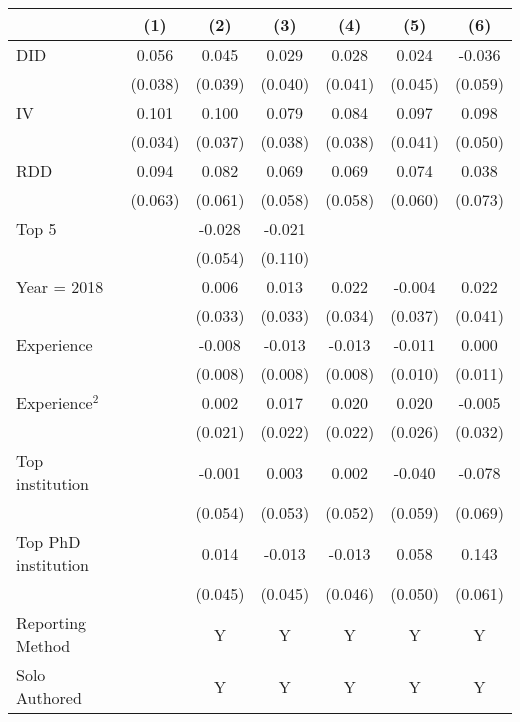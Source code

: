 \begin{tabular}{l*{6}{c}}
\hline\hline
                &\multicolumn{1}{c}{(1)}&\multicolumn{1}{c}{(2)}&\multicolumn{1}{c}{(3)}&\multicolumn{1}{c}{(4)}&\multicolumn{1}{c}{(5)}&\multicolumn{1}{c}{(6)}\\
\hline
DID             &    0.056&    0.045&    0.029&    0.028&    0.024&   -0.036\\
                &  (0.038)&  (0.039)&  (0.040)&  (0.041)&  (0.045)&  (0.059)\\
IV              &    0.101&    0.100&    0.079&    0.084&    0.097&    0.098\\
                &  (0.034)&  (0.037)&  (0.038)&  (0.038)&  (0.041)&  (0.050)\\
RDD             &    0.094&    0.082&    0.069&    0.069&    0.074&    0.038\\
                &  (0.063)&  (0.061)&  (0.058)&  (0.058)&  (0.060)&  (0.073)\\
Top 5           &         &   -0.028&   -0.021&         &         &         \\
                &         &  (0.054)&  (0.110)&         &         &         \\
Year = 2018     &         &    0.006&    0.013&    0.022&   -0.004&    0.022\\
                &         &  (0.033)&  (0.033)&  (0.034)&  (0.037)&  (0.041)\\
Experience      &         &   -0.008&   -0.013&   -0.013&   -0.011&    0.000\\
                &         &  (0.008)&  (0.008)&  (0.008)&  (0.010)&  (0.011)\\
Experience$^2$  &         &    0.002&    0.017&    0.020&    0.020&   -0.005\\
                &         &  (0.021)&  (0.022)&  (0.022)&  (0.026)&  (0.032)\\
Top institution &         &   -0.001&    0.003&    0.002&   -0.040&   -0.078\\
                &         &  (0.054)&  (0.053)&  (0.052)&  (0.059)&  (0.069)\\
Top PhD institution&         &    0.014&   -0.013&   -0.013&    0.058&    0.143\\
                &         &  (0.045)&  (0.045)&  (0.046)&  (0.050)&  (0.061)\\
Reporting Method &         &        Y&        Y&        Y&        Y&        Y\\
Solo Authored   &         &        Y&        Y&        Y&        Y&        Y\\

\end{tabular}
